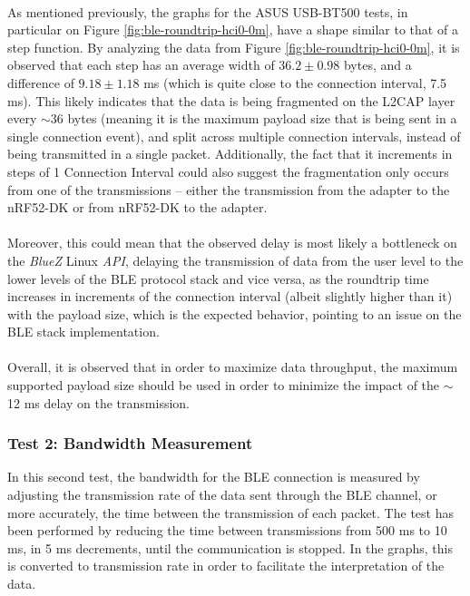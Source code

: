 \paragraph{} As mentioned previously, the graphs for the ASUS USB-BT500 tests, in particular on Figure \ref{fig:ble-roundtrip-hci0-0m}, have a shape similar to that of a step function. By analyzing the data from Figure \ref{fig:ble-roundtrip-hci0-0m}, it is observed that each step has an average width of $36.2 \pm 0.98$ bytes, and a difference of $9.18 \pm 1.18$ ms (which is quite close to the connection interval, 7.5 ms). This likely indicates that the data is being fragmented on the \acs{L2CAP} layer every $\sim$36 bytes (meaning it is the maximum payload size that is being sent in a single connection event), and split across multiple connection intervals, instead of being transmitted in a single packet. Additionally, the fact that it increments in steps of 1 Connection Interval could also suggest the fragmentation only occurs from one of the transmissions -- either the transmission from the adapter to the nRF52-DK or from nRF52-DK to the adapter. 

\paragraph{} Moreover, this could mean that the observed delay is most likely a bottleneck on the \textit{BlueZ} Linux \textit{API}, delaying the transmission of data from the user level to the lower levels of the \acs{BLE} protocol stack and vice versa, as the roundtrip time increases in increments of the connection interval (albeit slightly higher than it) with the payload size, which is the expected behavior, pointing to an issue on the \acs{BLE} stack implementation.

\paragraph{} Overall, it is observed that in order to maximize data throughput, the maximum supported payload size should be used in order to minimize the impact of the $\sim$12 ms delay on the transmission.

\subsubsection{Test 2: Bandwidth Measurement}

In this second test, the bandwidth for the \acs{BLE} connection is measured by adjusting the transmission rate of the data sent through the BLE channel, or more accurately, the time between the transmission of each packet. The test has been performed by reducing the time between transmissions from 500 ms to 10 ms, in 5 ms decrements, until the communication is stopped. In the graphs, this is converted to transmission rate in order to facilitate the interpretation of the data.

